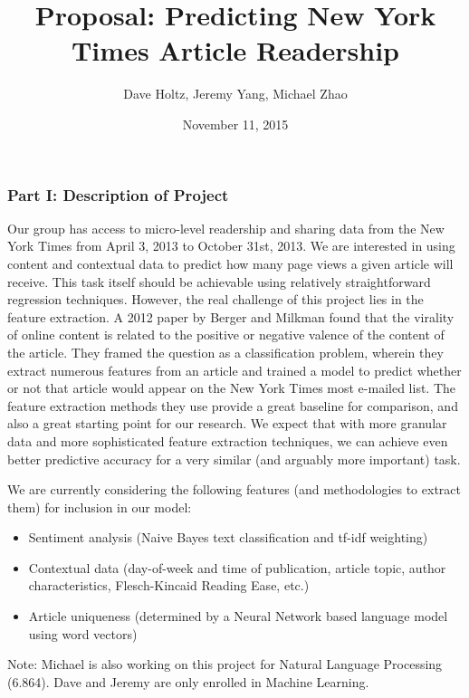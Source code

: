 \documentclass[10pt]{article}
\begin{document}
	\title{Proposal: Predicting New  York Times Article Readership}
	\date{November 11, 2015}
	\author{Dave Holtz, Jeremy Yang, Michael Zhao}
	\maketitle
	
\subsubsection*{Part I: Description of Project}

Our group has access to micro-level readership and sharing data from the New York Times from April 3, 2013 to October 31st, 2013. We are interested in using content and contextual data to predict how many page views a given article will receive. This task itself should be achievable using relatively straightforward regression techniques. However, the real challenge of this project lies in the feature extraction. A 2012 paper by Berger and Milkman \cite{berger} found that the virality of online content is related to the positive or negative valence of the content of the article. They framed the question as a classification problem, wherein they extract numerous features from an article and trained a model to predict whether or not that article would appear on the New York Times most e-mailed list. The feature extraction methods they use provide a great baseline for comparison, and also a great starting point for our research. We expect that with more granular data and more sophisticated feature extraction techniques, we can achieve even better predictive accuracy for a very similar (and arguably more important) task.

We are currently considering the following features (and methodologies to extract them) for inclusion in our model:
\begin{itemize}
\item Sentiment analysis (Naive Bayes text classification and tf-idf weighting)
\item Contextual data (day-of-week and time of publication, article topic, author characteristics, Flesch-Kincaid Reading Ease, etc.)
\item Article uniqueness (determined by a Neural Network based language model using word vectors)
\end{itemize}

Note: Michael is also working on this project for Natural Language Processing (6.864). Dave and Jeremy are only enrolled in Machine Learning.
\end{document}

